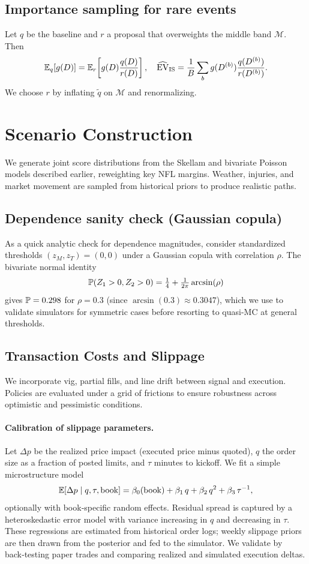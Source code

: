 \subsection{Importance sampling for rare events}\label{subsec:is}
Let $q$ be the baseline and $r$ a proposal that overweights the middle band $\mathcal{M}$.
Then
\[
\mathbb{E}_q[g(D)] = \mathbb{E}_r\!\left[g(D)\frac{q(D)}{r(D)}\right],\quad
\widehat{\mathrm{EV}}_{\mathrm{IS}}=\frac1B\sum_b g(D^{(b)})\frac{q(D^{(b)})}{r(D^{(b)})}.
\]
We choose $r$ by inflating $\tilde q$ on $\mathcal{M}$ and renormalizing.

\section{Scenario Construction}
We generate joint score distributions from the Skellam and bivariate Poisson models described earlier, reweighting key NFL margins. Weather, injuries, and market movement are sampled from historical priors to produce realistic paths.

\subsection{Dependence sanity check (Gaussian copula)}
As a quick analytic check for dependence magnitudes, consider standardized thresholds $(z_M,z_T)=(0,0)$ under a Gaussian copula with correlation $\rho$. The bivariate normal identity
\[\mathbb{P}(Z_1>0, Z_2>0)=\tfrac{1}{4}+\tfrac{1}{2\pi}\arcsin(\rho)\]
gives $\mathbb{P}=0.298$ for $\rho=0.3$ (since $\arcsin(0.3)\approx 0.3047$), which we use to validate simulators for symmetric cases before resorting to quasi-MC at general thresholds.

\subsection{Transaction Costs and Slippage}
We incorporate vig, partial fills, and line drift between signal and execution. Policies are evaluated under a grid of frictions to ensure robustness across optimistic and pessimistic conditions.

\paragraph{Calibration of slippage parameters.}
Let $\Delta p$ be the realized price impact (executed price minus quoted), $q$ the order size as a fraction of posted limits, and $\tau$ minutes to kickoff. We fit a simple microstructure model
\[\mathbb{E}[\Delta p\mid q,\tau,\text{book}]=\beta_0(\text{book})+\beta_1\,q+\beta_2\,q^2+\beta_3\,\tau^{-1},\]
optionally with book‑specific random effects. Residual spread is captured by a heteroskedastic error model with variance increasing in $q$ and decreasing in $\tau$. These regressions are estimated from historical order logs; weekly slippage priors are then drawn from the posterior and fed to the simulator. We validate by back‑testing paper trades and comparing realized and simulated execution deltas.

